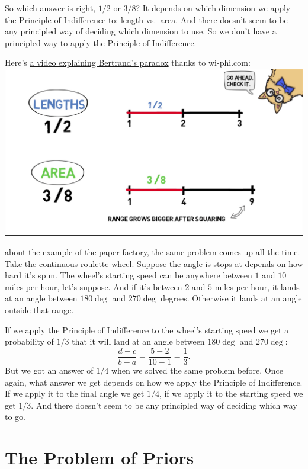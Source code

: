 \documentclass[justified]{tufte-book}
\theoremstyle{definition}
\theoremstyle{definition}
\theoremstyle{definition}
\theoremstyle{remark}
\begin{document}
So which answer is right, \(1/2\) or \(3/8\)? It depends on which
dimension we apply the Principle of Indifference to: length vs.~area.
And there doesn't seem to be any principled way of deciding which
dimension to use. So we don't have a principled way to apply the
Principle of Indifference.

\begin{marginfigure}
Here's \href{http://www.wi-phi.com/video/bertrands-paradox}{a video
explaining Bertrand's paradox} thanks to wi-phi.com:
\href{http://www.wi-phi.com/video/bertrands-paradox}{\includegraphics{img/bertrand_screengrab.png}}
\end{marginfigure}

 about the example of the paper
factory, the same problem comes up all the time. Take the continuous
roulette wheel. Suppose the angle is stops at depends on how hard it's
spun. The wheel's starting speed can be anywhere between \(1\) and
\(10\) miles per hour, let's suppose. And if it's between \(2\) and
\(5\) miles per hour, it lands at an angle between \(180\deg\) and
\(270\deg\) degrees. Otherwise it lands at an angle outside that range.

If we apply the Principle of Indifference to the wheel's starting speed
we get a probability of \(1/3\) that it will land at an angle between
\(180\deg\) and \(270\deg\):
\[ \frac{d-c}{b-a} = \frac{5-2}{10-1} = \frac{1}{3}. \] But we got an
answer of \(1/4\) when we solved the same problem before. Once again,
what answer we get depends on how we apply the Principle of
Indifference. If we apply it to the final angle we get \(1/4\), if we
apply it to the starting speed we get \(1/3\). And there doesn't seem to
be any principled way of deciding which way to go.

\hypertarget{the-problem-of-priors}{%
\section{The Problem of Priors}\label{the-problem-of-priors}}
\end{document}

